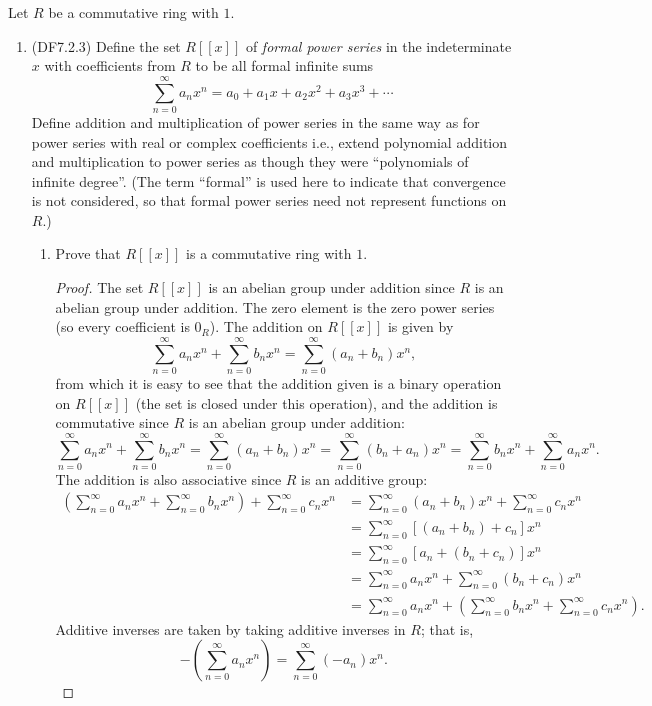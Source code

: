 \documentclass[11pt]{article}
\newcommand{\br}[1]{\left(#1\right)}
\begin{document}
Let $R$ be a commutative ring with $1$.
\begin{enumerate}
    \item (DF7.2.3) Define the set $R[[x]]$ of \textit{formal power series} in the indeterminate $x$ with coefficients from $R$ to be all formal infinite sums \[\sum_{n=0}^\infty a_nx^n = a_0 + a_1x + a_2x^2 + a_3x^3 + \cdots\] Define addition and multiplication of power series in the same way as for power series with real or complex coefficients i.e., extend polynomial addition and multiplication to power series as though they were ``polynomials of infinite degree''. (The term ``formal'' is used here to indicate that convergence is not considered, so that formal power series need not represent functions on $R$.) \begin{enumerate}
        \item Prove that $R[[x]]$ is a commutative ring with $1$. \begin{proof}
            The set $R[[x]]$ is an abelian group under addition since $R$ is an abelian group under addition. The zero element is the zero power series (so every coefficient is $0_R$). The addition on $R[[x]]$ is given by \[\sum_{n=0}^\infty a_nx^n + \sum_{n=0}^\infty b_nx^n = \sum_{n=0}^\infty (a_n+b_n)x^n,\] from which it is easy to see that the addition given is a binary operation on $R[[x]]$ (the set is closed under this operation), and the addition is commutative since $R$ is an abelian group under addition: \[\sum_{n=0}^\infty a_nx^n + \sum_{n=0}^\infty b_nx^n = \sum_{n=0}^\infty (a_n+b_n)x^n = \sum_{n=0}^\infty (b_n+a_n)x^n = \sum_{n=0}^\infty b_nx^n + \sum_{n=0}^\infty a_nx^n.\] The addition is also associative since $R$ is an additive group: \begin{align*}
                \br{\sum_{n=0}^\infty a_nx^n + \sum_{n=0}^\infty b_nx^n} + \sum_{n=0}^\infty c_nx^n &= \sum_{n=0}^\infty (a_n+b_n)x^n + \sum_{n=0}^\infty c_nx^n\\
                &= \sum_{n=0}^\infty [(a_n+b_n)+c_n]x^n\\
                &= \sum_{n=0}^\infty [a_n+(b_n+c_n)]x^n\\
                &=\sum_{n=0}^\infty a_nx^n + \sum_{n=0}^\infty (b_n+c_n)x^n\\
                &= \sum_{n=0}^\infty a_nx^n + \br{\sum_{n=0}^\infty b_nx^n + \sum_{n=0}^\infty c_nx^n}.
            \end{align*}
            Additive inverses are taken by taking additive inverses in $R$; that is, \[-\br{\sum_{n=0}^\infty a_nx^n} = \sum_{n=0}^\infty (-a_n)x^n.\]

\end{proof}
\end{enumerate}
\end{enumerate}
\end{document}
